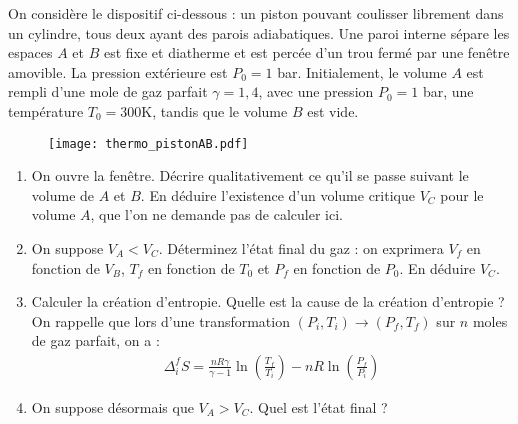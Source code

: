 On considère le dispositif ci-dessous : un piston pouvant coulisser librement dans un cylindre, tous deux ayant des parois adiabatiques. Une paroi interne sépare les espaces $A$ et $B$ est fixe et diatherme et est percée d'un trou fermé par une fenêtre amovible. La pression extérieure est $P_0=1$ bar. Initialement, le volume $A$ est rempli d'une mole de gaz parfait $\gamma=1,4$, avec une pression $P_0=1$ bar, une température $T_0=300$K, tandis que le volume $B$ est vide.

\begin{figure}[!h]
\centering
\texttt{[image: thermo\_pistonAB.pdf]}
\end{figure}

\begin{enumerate}
\item On ouvre la fenêtre. Décrire qualitativement ce qu'il se passe suivant le volume de $A$ et $B$. En déduire l'existence d'un volume critique $V_C$ pour le volume $A$, que l'on ne demande pas de calculer ici.

\item On suppose $V_A<V_C$. Déterminez l'état final du gaz : on exprimera $V_f$ en fonction de $V_B$, $T_f$ en fonction de $T_0$ et $P_f$ en fonction de $P_0$. En déduire $V_C$.

\item Calculer la création d'entropie. Quelle est la cause de la création d'entropie ? On rappelle que lors d'une transformation $(P_i,T_i)\rightarrow  (P_f, T_f)$ sur $n$ moles de gaz parfait, on a :
\begin{align*}
	\Delta_i^f S=\frac{nR\gamma}{\gamma-1}\ln\left(\frac{T_f}{T_i} \right) - nR\ln\left(\frac{P_f}{P_i} \right)
\end{align*}

\item On suppose désormais que $V_A>V_C$. Quel est l'état final ?

\end{enumerate}

\newpage

